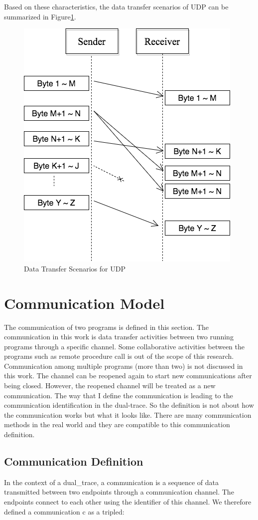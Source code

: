 Based on these characteristics, the data transfer scenarios of UDP can be summarized in Figure\ref{upd}.
\begin{figure}[H]
\centerline{\includegraphics[scale=0.48]{Figures/udp}}
 \caption{Data Transfer Scenarios for UDP}
\label{upd}
\end{figure}

\section{Communication Model}\label{definition}
The communication of two programs is defined in this section. The communication in this work is data transfer activities between two running programs through a specific channel. Some collaborative activities between the programs such as remote procedure call is out of the scope of this research. Communication among multiple programs (more than two) is not discussed in this work. The channel can be reopened again to start new communications after being closed. However, the reopened channel will be treated as a new communication. The way that I define the communication is leading to the communication identification in the dual-trace. So the definition is not about how the communication works but what it looks like. There are many communication methods in the real world and they are compatible to this communication definition. 

\subsection{Communication Definition}
In the context of a dual\_trace, a communication is a sequence of data transmitted between two endpoints through a communication channel. The endpoints connect to each other using the identifier of this channel. We therefore defined a communication c as a tripled:

